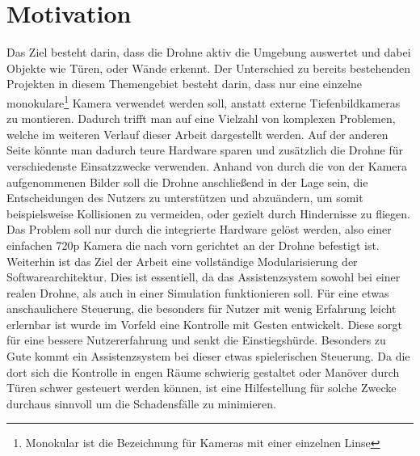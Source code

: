 \section{Motivation} %
Das Ziel besteht darin, dass die Drohne aktiv die Umgebung auswertet und dabei Objekte wie Türen, oder Wände erkennt. Der Unterschied zu bereits bestehenden Projekten in diesem Themengebiet besteht darin, dass nur eine einzelne monokulare\footnote{Monokular ist die Bezeichnung für Kameras mit einer einzelnen Linse} Kamera verwendet werden soll, anstatt externe Tiefenbildkameras zu montieren. \newline
Dadurch trifft man auf eine Vielzahl von komplexen Problemen, welche im weiteren Verlauf dieser Arbeit dargestellt werden. Auf der anderen Seite könnte man dadurch teure Hardware sparen und zusätzlich die Drohne für verschiedenste Einsatzzwecke verwenden. \newline
Anhand von durch die von der Kamera aufgenommenen Bilder soll die Drohne anschließend in der Lage sein, die Entscheidungen des Nutzers zu unterstützen und abzuändern, um somit beispielsweise Kollisionen zu vermeiden, oder gezielt durch Hindernisse zu fliegen. \newline
Das Problem soll nur durch die integrierte Hardware gelöst werden, also einer einfachen 720p Kamera die nach vorn gerichtet an der Drohne befestigt ist. Weiterhin ist das Ziel der Arbeit eine vollständige Modularisierung der Softwarearchitektur. Dies ist essentiell, da das Assistenzsystem sowohl bei einer realen Drohne, als auch in einer Simulation funktionieren soll.\newline
Für eine etwas anschaulichere Steuerung, die besonders für Nutzer mit wenig Erfahrung leicht erlernbar ist wurde im Vorfeld eine Kontrolle mit Gesten entwickelt. Diese sorgt für eine bessere Nutzererfahrung und senkt die Einstiegshürde.
Besonders zu Gute kommt ein Assistenzsystem bei dieser etwas spielerischen Steuerung. Da die dort sich die Kontrolle in engen  Räume schwierig gestaltet oder Manöver durch Türen schwer gesteuert werden können, ist eine Hilfestellung für solche Zwecke durchaus sinnvoll um die Schadensfälle zu minimieren. 
